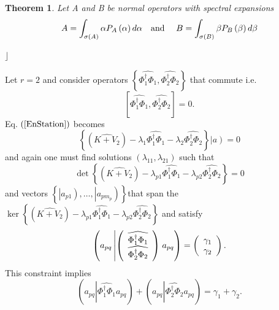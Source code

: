 \documentclass[aps,preprint]{revtex4}%
\newtheorem{theorem}{Theorem}
\begin{document}
\begin{theorem}
Let A and B be normal operators with spectral expansions
\begin{equation}
A=\int_{\sigma\left(  A\right)  }\alpha P_{A}\left(  \alpha\right)
d\alpha\quad\text{and \quad}B=\int_{\sigma\left(  B\right)  }\beta
P_{B}\left(  \beta\right)  d\beta
\end{equation}

\end{theorem}

$\rfloor$

Let $r=2$ and consider operators $\left\{  \widehat{\Phi_{1}^{\dagger}\Phi
_{1}},\widehat{\Phi_{2}^{\dagger}\Phi_{2}}\right\}  $ that commute i.e.
\begin{equation}
\left[  \widehat{\Phi_{1}^{\dagger}\Phi_{1}},\widehat{\Phi_{2}^{\dagger}%
\Phi_{2}}\right]  =0.
\end{equation}
Eq. $\left(  \ref{EnStation}\right)  $ becomes
\begin{equation}
\left\{  \left(  \widehat{K+V_{2}}\right)  -\lambda_{1}\widehat{\Phi
_{1}^{\dagger}\Phi_{1}}-\lambda_{2}\widehat{\Phi_{2}^{\dagger}\Phi_{2}%
}\right\}  \left\vert \overset{}{a}\right)  =0
\end{equation}
and again one must find solutions $\left(  \lambda_{11},\lambda_{21}\right)  $
such that
\begin{equation}
\det\left\{  \left(  \widehat{K+V_{2}}\right)  -\lambda_{p1}\widehat{\Phi
_{1}^{\dagger}\Phi_{1}}-\lambda_{p2}\widehat{\Phi_{2}^{\dagger}\Phi_{2}%
}\right\}  =0
\end{equation}
and vectors $\left\{  \left\vert \overset{}{a_{p1}}\right)  ,\ldots,\left\vert
\overset{}{a_{pm_{p}}}\right)  \right\}  $that span the $\ker\left\{  \left(
\widehat{K+V_{2}}\right)  -\lambda_{p1}\widehat{\Phi_{1}^{\dagger}\Phi_{1}%
}-\lambda_{p2}\widehat{\Phi_{2}^{\dagger}\Phi_{2}}\right\}  $ and satisfy
\begin{equation}
\left(  a_{pq}\left\vert \left(
\begin{array}
[c]{c}%
\widehat{\Phi_{1}^{\dagger}\Phi_{1}}\\
\widehat{\Phi_{2}^{\dagger}\Phi_{2}}%
\end{array}
\right)  \right.  a_{pq}\right)  =\left(
\begin{array}
[c]{c}%
\gamma_{1}\\
\gamma_{2}%
\end{array}
\right)  .
\end{equation}
This constraint implies
\begin{equation}
\left(  a_{pq}\left\vert \widehat{\Phi_{1}^{\dagger}\Phi_{1}}\right.
a_{pq}\right)  +\left(  a_{pq}\left\vert \widehat{\Phi_{2}^{\dagger}\Phi_{2}%
}\right.  a_{pq}\right)  =\gamma_{1}+\gamma_{2}.
\end{equation}
\end{document}
